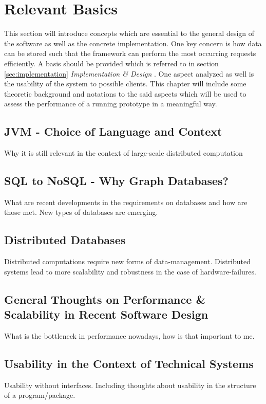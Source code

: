 \documentclass[twoside, 11pt]{scrartcl}
\begin{document}
\section{Relevant Basics}
\label{sec:basics}
This section will introduce concepts which are essential to the general design of the software as well as the concrete implementation. One key concern is how  data can be stored such that the framework can perform the most occurring requests efficiently. A basis should be provided which is referred to in section \ref{sec:implementation} \textit{Implementation \& Design} . One aspect analyzed as well is the usability of the system to possible clients. This chapter will include some theoretic background and notations to the said aspects which will be used to assess the performance of a running prototype in a meaningful way. 
\subsection{JVM - Choice of Language and Context}
\label{sec:jvm}
Why it is still relevant in the context of large-scale distributed computation
\subsection{SQL to NoSQL - Why Graph Databases?}
What are recent developments in the requirements on databases and how are those met. New types of databases are emerging.
\subsection{Distributed Databases}
Distributed computations require new forms of data-management. Distributed systems lead to more scalability and robustness in the case of hardware-failures.
\subsection{General Thoughts on Performance \& Scalability in Recent Software Design}
What is the bottleneck in performance nowadays, how is that important to me.

\subsection{Usability in the Context of Technical Systems}
Usability without interfaces. Including thoughts about usability in the structure of a program/package.
\end{document}
